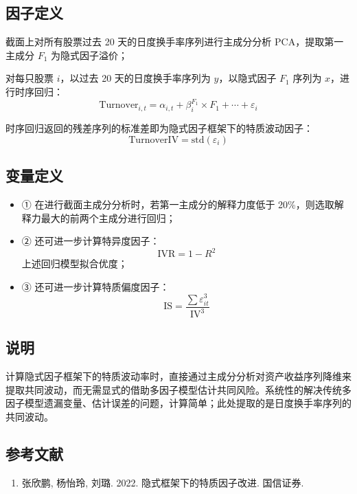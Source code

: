 \documentclass{article}
\begin{document}
\subsection{因子定义}

截面上对所有股票过去 20 天的日度换手率序列进行主成分分析 PCA，提取第一主成分 \( F_1 \) 为隐式因子溢价；

对每只股票 \( i \)，以过去 20 天的日度换手率序列为 \( y \)，以隐式因子 \( F_1 \) 序列为 \( x \)，进行时序回归：
\begin{equation}
    \mathrm{Turnover}_{i,t} = \alpha_{i,t} + \beta_i^{F_1} \times F_1 + \cdots + \varepsilon_i
\end{equation}

时序回归返回的残差序列的标准差即为隐式因子框架下的特质波动因子：
\begin{equation}
    \mathrm{TurnoverIV} = \mathrm{std}(\varepsilon_i)
\end{equation}

\subsection{变量定义}
\begin{itemize}
    \item ① 在进行截面主成分分析时，若第一主成分的解释力度低于 20\%，则选取解释力最大的前两个主成分进行回归；
    \item ② 还可进一步计算特异度因子：
        \begin{equation*}
            \mathrm{IVR} = 1 - R^2
        \end{equation*}
        上述回归模型拟合优度；
    \item ③ 还可进一步计算特质偏度因子：
        \begin{equation*}
            \mathrm{IS} = \frac{\sum \varepsilon_{it}^3}{\mathrm{IV}^3}
        \end{equation*}
\end{itemize}

\subsection{说明}
计算隐式因子框架下的特质波动率时，直接通过主成分分析对资产收益序列降维来提取共同波动，而无需显式的借助多因子模型估计共同风险。系统性的解决传统多因子模型遗漏变量、估计误差的问题，计算简单；此处提取的是日度换手率序列的共同波动。

\subsection{参考文献}
\begin{enumerate}
    \item 张欣鹏, 杨怡玲, 刘璐. 2022. 隐式框架下的特质因子改进. 国信证券.
\end{enumerate}
\end{document}

